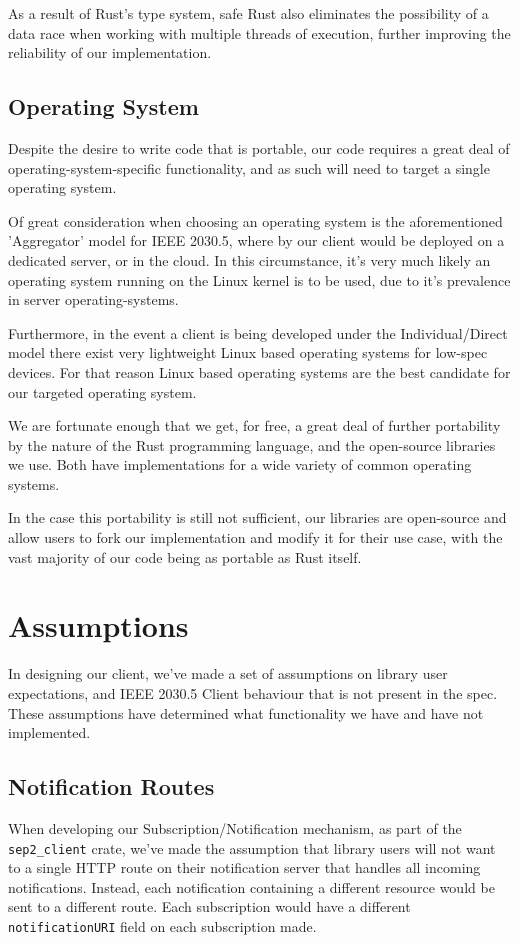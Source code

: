 As a result of Rust's type system, safe Rust also eliminates the possibility of a data race when working with multiple threads of execution, further improving the reliability of our implementation.

\subsection{Operating System}
Despite the desire to write code that is portable, our code requires a great deal of operating-system-specific functionality, and as such will need to target a single operating system. 

Of great consideration when choosing an operating system is the aforementioned 'Aggregator' model for IEEE 2030.5, where by our client would be deployed on a dedicated server, or in the cloud. In this circumstance, it's very much likely an operating system running on the Linux kernel is to be used, due to it's prevalence in server operating-systems.

Furthermore, in the event a client is being developed under the Individual/Direct model there exist very lightweight Linux based operating systems for low-spec devices. For that reason Linux based operating systems are the best candidate for our targeted operating system.

We are fortunate enough that we get, for free, a great deal of further portability by the nature of the Rust programming language, and the open-source libraries we use. Both have implementations for a wide variety of common operating systems. \cite{RustPlatforms} \cite{TokioDocs}

In the case this portability is still not sufficient, our libraries are open-source and allow users to fork our implementation and modify it for their use case, with the vast majority of our code being as portable as Rust itself.
    
\section{Assumptions}
In designing our client, we've made a set of assumptions on library user expectations, and IEEE 2030.5 Client behaviour that is not present in the spec. These assumptions have determined what functionality we have and have not implemented.

\subsection{Notification Routes}
When developing our Subscription/Notification mechanism, as part of the \texttt{sep2\_client} crate, we've made the assumption that library users will not want to a single HTTP route on their notification server that handles all incoming notifications. Instead, each notification containing a different resource would be sent to a different route. Each subscription would have a different \texttt{notificationURI} field on each subscription made.

